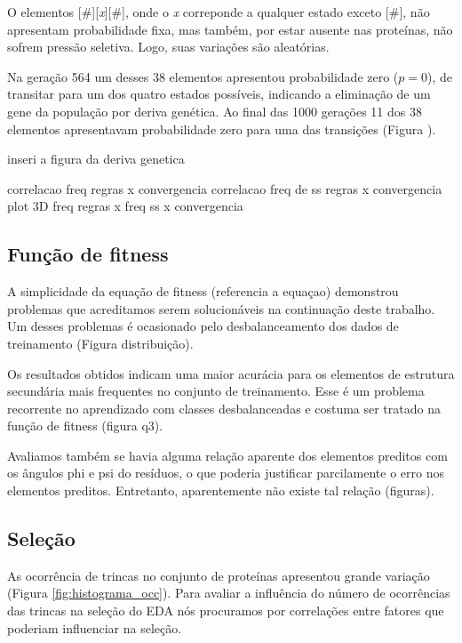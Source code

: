 O elementos [\#][\textit{x}][\#], onde o \textit{x} correponde a qualquer estado exceto [\#], não apresentam probabilidade fixa, mas também, por estar ausente nas proteínas, não sofrem pressão seletiva. Logo, suas variações são aleatórias.

Na geração 564 um desses 38 elementos apresentou probabilidade zero ($p=0$), de transitar para um dos quatro estados possíveis, indicando a eliminação de um gene da população por deriva genética. Ao final das 1000 gerações 11 dos 38 elementos apresentavam probabilidade zero para uma das transições (Figura ).

inseri a figura da deriva genetica 

     
correlacao freq regras x convergencia
correlacao freq de ss regras x convergencia
plot 3D freq regras x freq ss x convergencia

\subsection{Função de fitness}

A simplicidade da equação de fitness (referencia a equaçao) demonstrou problemas que acreditamos serem solucionáveis na continuação deste trabalho. Um desses problemas é ocasionado pelo desbalanceamento dos dados de treinamento (Figura distribuição). 

Os resultados obtidos indicam uma maior acurácia para os elementos de estrutura secundária mais frequentes no conjunto de treinamento. Esse é um problema recorrente no aprendizado com classes desbalanceadas e costuma ser tratado na função de fitness (figura q3). 

Avaliamos também se havia alguma relação aparente dos elementos preditos com os ângulos phi e psi do resíduos, o que poderia justificar parcilamente o erro nos elementos preditos. Entretanto, aparentemente não existe tal relação (figuras).



\subsection{Seleção}

As ocorrência de trincas no conjunto de proteínas apresentou grande variação (Figura \ref{fig:histograma_occ}). Para avaliar a influência do número de ocorrências das trincas na seleção do EDA nós procuramos por correlações entre fatores que poderiam influenciar na seleção.

